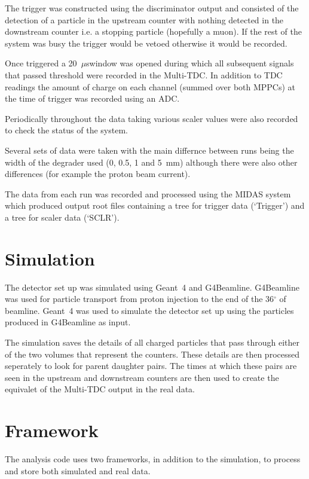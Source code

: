 \documentclass[]{article}
\newcommand{\ms}{\(\mu\)s}
\begin{document}
The trigger was constructed using the discriminator output and consisted of the detection of a particle in the upstream counter with nothing detected in the downstream counter i.e. a stopping particle (hopefully a muon). If the rest of the system was busy the trigger would be vetoed otherwise it would be recorded. 

Once triggered a  20~\ms window was opened during which all subsequent signals that passed threshold were recorded in the Multi-TDC. In addition to TDC readings the amount of charge on each channel (summed over both MPPCs) at the time of trigger was recorded using an ADC.

Periodically throughout the data taking various scaler values were also recorded to check the status of the system.

Several sets of data were taken with the main differnce between runs being the width of the degrader used (0, 0.5, 1 and 5~mm) although there were also other differences (for example the proton beam current).

The data from each run was recorded and processed using the MIDAS system which produced output root files containing a tree for trigger data (`Trigger') and a tree for scaler data (`SCLR'). 

\section{Simulation}\label{sec:simulation}
The detector set up was simulated using Geant~4 and G4Beamline. G4Beamline was used for particle transport from proton injection to the end of the 36\(^{\circ}\) of beamline. Geant~4 was used to simulate the detector set up using the particles produced in G4Beamline as input.

The simulation saves the details of all charged particles that pass through either of the two volumes that represent the counters. These details are then processed seperately to look for parent daughter pairs. The times at which these pairs are seen in the upstream and downstream counters are then used to create the equivalet of the Multi-TDC output in the real data.

\section{Framework}\label{sec:framework}
The analysis code uses two frameworks, in addition to the simulation, to process and store both simulated and real data. 
\end{document}
